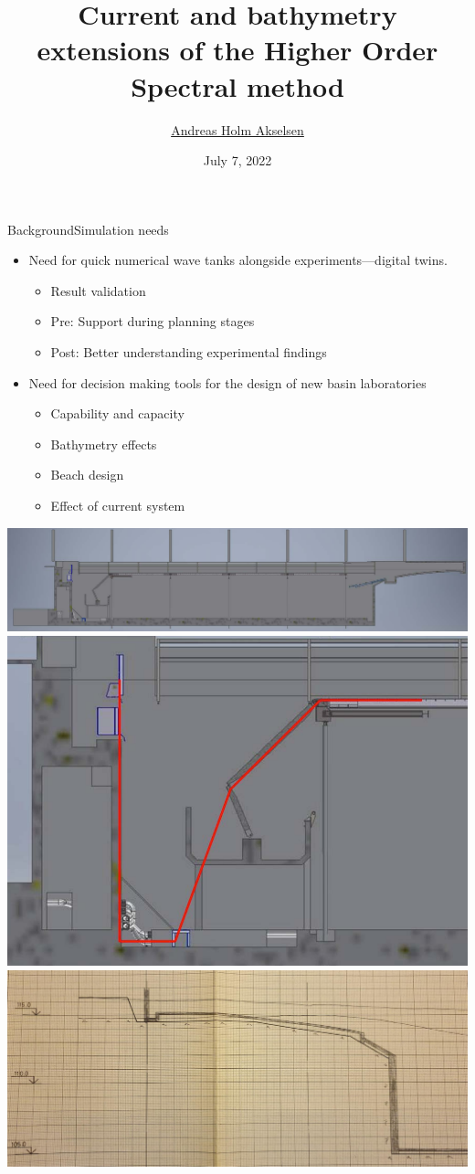 \documentclass{sintefbeamer}
\title{Current and bathymetry extensions of the Higher Order Spectral method}
\author{\href{mailto:andreas.akselsen@sintef.no}{Andreas Holm Akselsen}}
\date{July 7, 2022}
\renewcommand{\_}[1]{_\mr{#1}}
\begin{document}
\maketitle

\newcommand {\framedgraphic}[2] {
    \begin{frame}{#1}
        \begin{center}
            \texttt{[image: \#2]}
        \end{center}
    \end{frame}
}


\begin{frame}{Background}{Simulation needs}
\vspace{-.5cm}
\small
\begin{itemize}
	\item Need for quick numerical wave tanks alongside experiments---digital twins.
	\begin{itemize}
		\item Result validation
		\item Pre: Support during planning stages
		\item Post: Better understanding experimental findings
	\end{itemize}
	\item Need for decision making tools for the design of new basin laboratories
	\begin{itemize}
		\item Capability and capacity
		\item Bathymetry effects
		\item Beach design
		\item Effect of current system
	\end{itemize}
\end{itemize}
\vspace{2mm}
\includegraphics[width=.45\textwidth,align=t]{./oldOB.PNG}%
\includegraphics[width=.25\textwidth,align=t]{./oldFloorRamp.PNG}%
\includegraphics[width=.3\textwidth,align=t]{./oldBeachDrawing.png}%
\end{frame}
\end{document}
